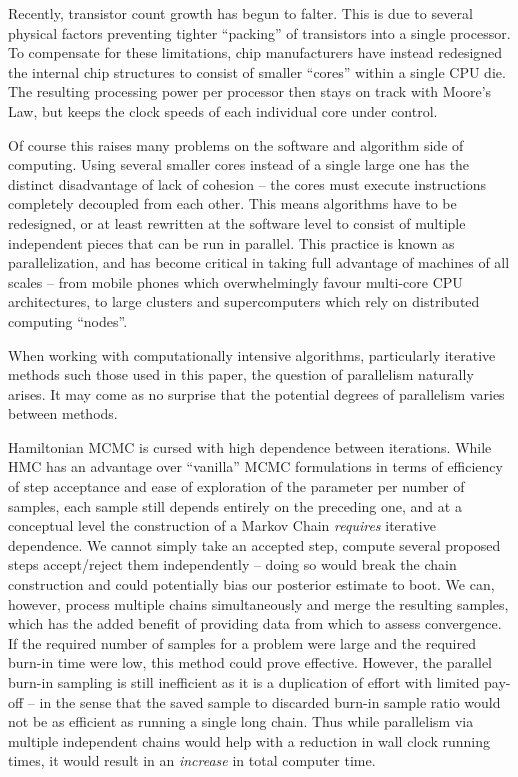 	Recently, transistor count growth has begun to falter. This is due to several physical factors preventing tighter ``packing'' of transistors into a single processor. To compensate for these limitations, chip manufacturers have instead redesigned the internal chip structures to consist of smaller ``cores'' within a single CPU die. The resulting processing power per processor then stays on track with Moore's Law, but keeps the clock speeds of each individual core under control.

	Of course this raises many problems on the software and algorithm side of computing. Using several smaller cores instead of a single large one has the distinct disadvantage of lack of cohesion -- the cores must execute instructions completely decoupled from each other. This means algorithms have to be redesigned, or at least rewritten at the software level to consist of multiple independent pieces that can be run in parallel. This practice is known as parallelization, and has become critical in taking full advantage of machines of all scales -- from mobile phones which overwhelmingly favour multi-core CPU architectures, to large clusters and supercomputers which rely on distributed computing ``nodes''.

	When working with computationally intensive algorithms, particularly iterative methods such those used in this paper, the question of parallelism naturally arises. It may come as no surprise that the potential degrees of parallelism varies between methods.

	Hamiltonian MCMC is cursed with high dependence between iterations. While HMC has an advantage over ``vanilla'' MCMC formulations in terms of efficiency of step acceptance and ease of exploration of the parameter per number of samples, each sample still depends entirely on the preceding one, and at a conceptual level the construction of a Markov Chain \textit{requires} iterative dependence. We cannot simply take an accepted step, compute several proposed steps accept/reject them independently -- doing so would break the chain construction and could potentially bias our posterior estimate to boot. We can, however, process multiple chains simultaneously and merge the resulting samples, which has the added benefit of providing data from which to assess convergence. If the required number of samples for a problem were large and the required burn-in time were low, this method could prove effective. However, the parallel burn-in sampling is still inefficient as it is a duplication of effort with limited pay-off -- in the sense that the saved sample to discarded burn-in sample ratio would not be as efficient as running a single long chain. Thus while parallelism via multiple independent chains would help with a reduction in wall clock running times, it would result in an \textit{increase} in total computer time.

